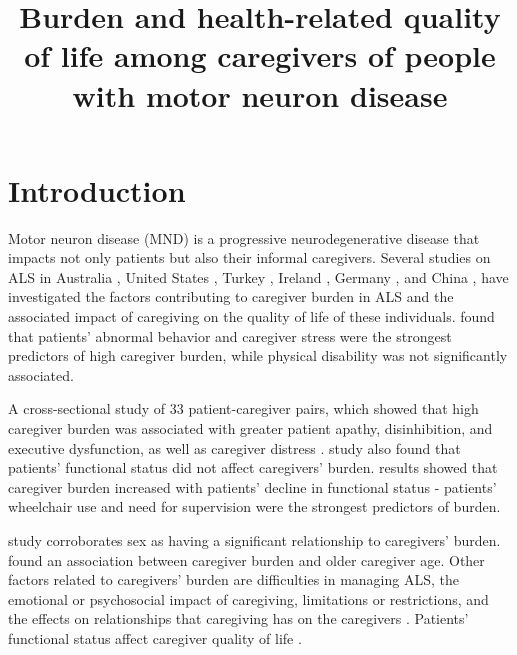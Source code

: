 \documentclass[12pt]{article}
\title{\LARGE \bfseries \vspace{-2cm} Burden and health-related quality of life among caregivers of people with motor neuron disease}
\author{\vspace{-2cm}}
\date{\vspace{-2cm}}
\begin{document}
\fontsize{13pt}{15pt}\selectfont

\maketitle


\section*{Introduction}
Motor neuron disease (MND) is a progressive neurodegenerative disease that impacts not only patients but also their informal caregivers. Several studies on ALS in Australia \parencite{lillo_caregiver_2012}, United States \parencite{qutub_life_2014, burke_caregiver_2015, roach_dynamics_2009}, Turkey \parencite{tulek_care_2023}, Ireland \parencite{galvin_caregiving_2016}, Germany \parencite{schischlevskij_informal_2021}, and China \parencite{geng_patients_2017}, have investigated the factors contributing to caregiver burden in ALS and the associated impact of caregiving on the quality of life of these individuals. \textcite{lillo_caregiver_2012} found that patients' abnormal behavior and caregiver stress were the strongest predictors of high caregiver burden, while physical disability was not significantly associated. 

A cross-sectional study of 33 patient-caregiver pairs, which showed that high caregiver burden was associated with greater patient apathy, disinhibition, and executive dysfunction, as well as caregiver distress \parencite{burke_caregiver_2015}. \textcite{qutub_life_2014} study also found that patients' functional status did not affect caregivers' burden. \textcite{schischlevskij_informal_2021} results showed that caregiver burden increased with patients' decline in functional status - patients' wheelchair use and need for supervision were the strongest predictors of burden.

\textcite{tulek_care_2023} study corroborates sex as having a significant relationship to caregivers' burden. \textcite{geng_patients_2017} found an association between caregiver burden and older caregiver age. Other factors related to caregivers' burden are difficulties in managing ALS, the emotional or psychosocial impact of caregiving, limitations or restrictions, and the effects on relationships that caregiving has on the caregivers \parencite{galvin_caregiving_2016}. Patients' functional status affect caregiver quality of life \parencite{roach_dynamics_2009}.
\end{document}
